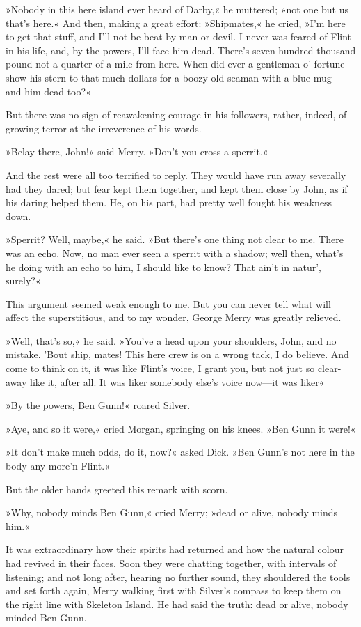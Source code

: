 »Nobody in this here island ever heard of Darby,« he muttered; »not one but us that's here.« And then, making a great effort: »Shipmates,« he cried, »I'm here to get that stuff, and I'll not be beat by man or devil. I never was feared of Flint in his life, and, by the powers, I'll face him dead. There's seven hundred thousand pound not a quarter of a mile from here. When did ever a gentleman o' fortune show his stern to that much dollars for a boozy old seaman with a blue mug—and him dead too?«

But there was no sign of reawakening courage in his followers, rather, indeed, of growing terror at the irreverence of his words.

»Belay there, John!« said Merry. »Don't you cross a sperrit.«

And the rest were all too terrified to reply. They would have run away severally had they dared; but fear kept them together, and kept them close by John, as if his daring helped them. He, on his part, had pretty well fought his weakness down.

»Sperrit? Well, maybe,« he said. »But there's one thing not clear to me. There was an echo. Now, no man ever seen a sperrit with a shadow; well then, what's he doing with an echo to him, I should like to know? That ain't in natur', surely?«

This argument seemed weak enough to me. But you can never tell what will affect the superstitious, and to my wonder, George Merry was greatly relieved.

»Well, that's so,« he said. »You've a head upon your shoulders, John, and no mistake. 'Bout ship, mates! This here crew is on a wrong tack, I do believe. And come to think on it, it was like Flint's voice, I grant you, but not just so clear-away like it, after all. It was liker somebody else's voice now—it was liker\longdash«

»By the powers, Ben Gunn!« roared Silver.

»Aye, and so it were,« cried Morgan, springing on his knees. »Ben Gunn it were!«

»It don't make much odds, do it, now?« asked Dick. »Ben Gunn's not here in the body any more'n Flint.«

But the older hands greeted this remark with scorn.

»Why, nobody minds Ben Gunn,« cried Merry; »dead or alive, nobody minds him.«

It was extraordinary how their spirits had returned and how the natural colour had revived in their faces. Soon they were chatting together, with intervals of listening; and not long after, hearing no further sound, they shouldered the tools and set forth again, Merry walking first with Silver's compass to keep them on the right line with Skeleton Island. He had said the truth: dead or alive, nobody minded Ben Gunn.

